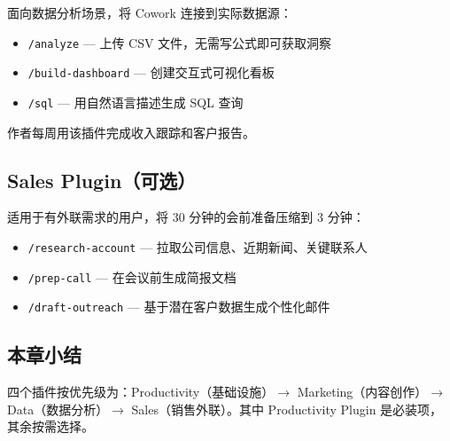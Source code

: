 面向数据分析场景，将 Cowork 连接到实际数据源：

\begin{itemize}
    \item \texttt{/analyze} --- 上传 CSV 文件，无需写公式即可获取洞察
    \item \texttt{/build-dashboard} --- 创建交互式可视化看板
    \item \texttt{/sql} --- 用自然语言描述生成 SQL 查询
\end{itemize}

作者每周用该插件完成收入跟踪和客户报告。

\subsection{Sales Plugin（可选）}

适用于有外联需求的用户，将 30 分钟的会前准备压缩到 3 分钟：

\begin{itemize}
    \item \texttt{/research-account} --- 拉取公司信息、近期新闻、关键联系人
    \item \texttt{/prep-call} --- 在会议前生成简报文档
    \item \texttt{/draft-outreach} --- 基于潜在客户数据生成个性化邮件
\end{itemize}

\subsection{本章小结}

四个插件按优先级为：Productivity（基础设施）$\to$ Marketing（内容创作）$\to$ Data（数据分析）$\to$ Sales（销售外联）。其中 Productivity Plugin 是必装项，其余按需选择。

